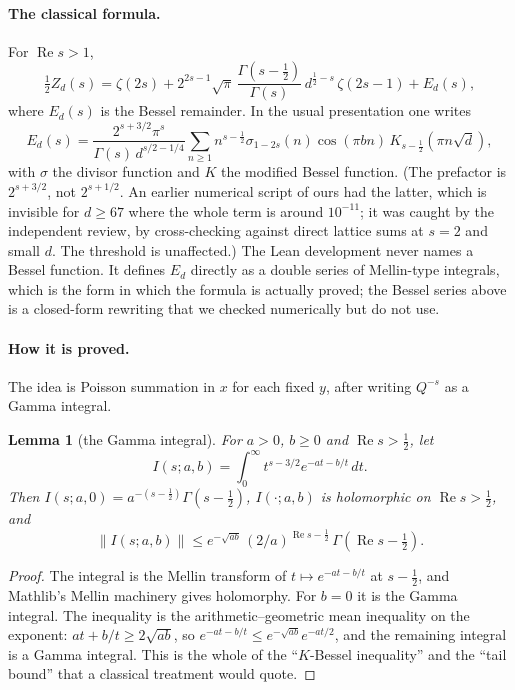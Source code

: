 \documentclass[11pt]{article}
\newtheorem{lemma}[theorem]{Lemma}
\theoremstyle{definition}
\newcommand{\re}{\operatorname{Re}}
\begin{document}
\paragraph{The classical formula.} For $\re s > 1$,
\begin{equation}\label{eq:cs}
\tfrac12 Z_d(s) = \zeta(2s) + 2^{2s-1}\sqrt{\pi}\,\frac{\Gamma(s-\frac12)}{\Gamma(s)}\, d^{\frac12 - s}\,\zeta(2s-1) + E_d(s),
\end{equation}
where $E_d(s)$ is the Bessel remainder. In the usual presentation one writes
\[
E_d(s) = \frac{2^{s+3/2}\pi^s}{\Gamma(s)\,d^{s/2-1/4}} \sum_{n \ge 1} n^{s-\frac12}\sigma_{1-2s}(n)\cos(\pi bn)\,K_{s-\frac12}(\pi n\sqrt d),
\]
with $\sigma$ the divisor function and $K$ the modified Bessel function. (The prefactor is $2^{s+3/2}$, not $2^{s+1/2}$. An earlier numerical script of ours had the latter, which is invisible for $d \ge 67$ where the whole term is around $10^{-11}$; it was caught by the independent review, by cross-checking against direct lattice sums at $s = 2$ and small $d$. The threshold is unaffected.) The Lean development never names a Bessel function. It defines $E_d$ directly as a double series of Mellin-type integrals, which is the form in which the formula is actually proved; the Bessel series above is a closed-form rewriting that we checked numerically but do not use.

\paragraph{How it is proved.} The idea is Poisson summation in $x$ for each fixed $y$, after writing $Q^{-s}$ as a Gamma integral.

\begin{lemma}[the Gamma integral]\label{lem:I}
For $a > 0$, $b \ge 0$ and $\re s > \frac12$, let
\[
I(s; a, b) = \int_0^\infty t^{s-3/2} e^{-at - b/t}\,dt .
\]
Then $I(s; a, 0) = a^{-(s-\frac12)}\Gamma(s - \frac12)$, $I(\cdot; a, b)$ is holomorphic on $\re s > \frac12$, and
\[
\|I(s;a,b)\| \le e^{-\sqrt{ab}}\,(2/a)^{\re s - \frac12}\,\Gamma(\re s - \tfrac12).
\]
\end{lemma}

\begin{proof}
The integral is the Mellin transform of $t \mapsto e^{-at-b/t}$ at $s - \frac12$, and Mathlib's Mellin machinery gives holomorphy. For $b = 0$ it is the Gamma integral. The inequality is the arithmetic--geometric mean inequality on the exponent: $at + b/t \ge 2\sqrt{ab}$, so $e^{-at-b/t} \le e^{-\sqrt{ab}}e^{-at/2}$, and the remaining integral is a Gamma integral. This is the whole of the ``$K$-Bessel inequality'' and the ``tail bound'' that a classical treatment would quote.
\end{proof}
\end{document}
